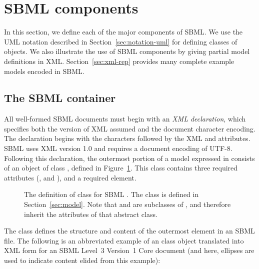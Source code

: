 
\section{SBML components}
\label{sec:elements}

In this section, we define each of the major components of SBML.
We use the UML notation described in
Section~\ref{sec:notation-uml} for defining classes of objects.
We also illustrate the use of SBML components by giving partial
model definitions in XML.  Section~\ref{sec:xml-rep} provides many
complete example models encoded in SBML.


\subsection{The SBML container}
\label{sec:sbml}

All well-formed SBML documents must begin with an \emph{XML
  declaration}, which specifies both the version of XML assumed
and the document character encoding.  The declaration begins with
the characters  followed by the XML 
and  attributes.  SBML \thisL uses XML version 1.0
and requires a document encoding of UTF-8.  Following this
declaration, the outermost portion of a model expressed in \thisL
consists of an object of class \SBML, defined in
Figure~\ref{fig:sbml}.  This class contains three required
attributes (,  and ), and
a required  element.

\begin{figure}[htb]
  \centering
  \small
  \vspace{1.5ex}
  \caption{The definition of class \SBML for SBML \thisLV.  The
    class \Model is defined in Section~\ref{sec:model}.  Note that
    \SBML and \Model are subclasses of \SBaseUpright, and therefore
    inherit the attributes of that abstract class.}
  \label{fig:sbml}
\end{figure}

The \SBML class defines the structure and content of the
 outermost element in an SBML file.  The following is
an abbreviated example of an \SBML class object translated into
XML form for an SBML Level~3 Version~1 Core document (and here,
ellipses are used to indicate content elided from this example):

